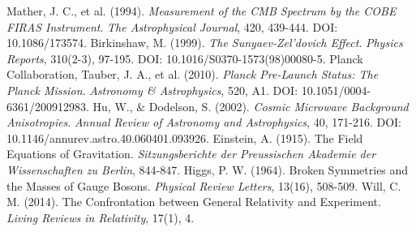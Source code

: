 \documentclass[12pt,a4paper]{article}
\begin{document}
\begin{thebibliography}{99}
		 Mather, J. C., et al. (1994). \textit{Measurement of the CMB Spectrum by the COBE FIRAS Instrument}. \textit{The Astrophysical Journal}, 420, 439-444. DOI: 10.1086/173574.
		 Birkinshaw, M. (1999). \textit{The Sunyaev-Zel'dovich Effect}. \textit{Physics Reports}, 310(2-3), 97-195. DOI: 10.1016/S0370-1573(98)00080-5.
		 Planck Collaboration, Tauber, J. A., et al. (2010). \textit{Planck Pre-Launch Status: The Planck Mission}. \textit{Astronomy \& Astrophysics}, 520, A1. DOI: 10.1051/0004-6361/200912983.
		 Hu, W., \& Dodelson, S. (2002). \textit{Cosmic Microwave Background Anisotropies}. \textit{Annual Review of Astronomy and Astrophysics}, 40, 171-216. DOI: 10.1146/annurev.astro.40.060401.093926.
		 Einstein, A. (1915). The Field Equations of Gravitation. \textit{Sitzungsberichte der Preussischen Akademie der Wissenschaften zu Berlin}, 844-847.
		 Higgs, P. W. (1964). Broken Symmetries and the Masses of Gauge Bosons. \textit{Physical Review Letters}, 13(16), 508-509.
		 Will, C. M. (2014). The Confrontation between General Relativity and Experiment. \textit{Living Reviews in Relativity}, 17(1), 4.
	\end{thebibliography}
	
\end{document}
